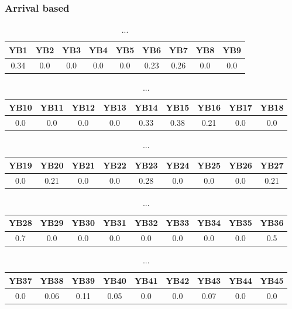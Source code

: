 \documentclass[]{article}
\begin{document}
\subsubsection{Arrival based}
\begin{table}[h]
      \centering
      \begin{tabular}{|c|c|c|c|c|c|c|c|c|}
            \hline
            YB1  & YB2 & YB3 & YB4 & YB5 & YB6  & YB7  & YB8 & YB9 \\
            \hline
            0.34 & 0.0 & 0.0 & 0.0 & 0.0 & 0.23 & 0.26 & 0.0 & 0.0 \\
            \hline
      \end{tabular}
      \caption{...}
\end{table}
\begin{table}[h]
      \centering
      \begin{tabular}{|c|c|c|c|c|c|c|c|c|}
            \hline
            YB10 & YB11 & YB12 & YB13 & YB14 & YB15 & YB16 & YB17 & YB18 \\
            \hline
            0.0  & 0.0  & 0.0  & 0.0  & 0.33 & 0.38 & 0.21 & 0.0  & 0.0  \\
            \hline
      \end{tabular}
      \caption{...}
\end{table}
\begin{table}[h]
      \centering
      \begin{tabular}{|c|c|c|c|c|c|c|c|c|}
            \hline
            YB19 & YB20 & YB21 & YB22 & YB23 & YB24 & YB25 & YB26 & YB27 \\
            \hline
            0.0  & 0.21 & 0.0  & 0.0  & 0.28 & 0.0  & 0.0  & 0.0  & 0.21 \\
            \hline
      \end{tabular}
      \caption{...}
\end{table}
\begin{table}[h]
      \centering
      \begin{tabular}{|c|c|c|c|c|c|c|c|c|}
            \hline
            YB28 & YB29 & YB30 & YB31 & YB32 & YB33 & YB34 & YB35 & YB36 \\
            \hline
            0.7  & 0.0  & 0.0  & 0.0  & 0.0  & 0.0  & 0.0  & 0.0  & 0.5  \\
            \hline
      \end{tabular}
      \caption{...}
\end{table}
\begin{table}[h]
      \centering
      \begin{tabular}{|c|c|c|c|c|c|c|c|c|}
            \hline
            YB37 & YB38 & YB39 & YB40 & YB41 & YB42 & YB43 & YB44 & YB45 \\
            \hline
            0.0  & 0.06 & 0.11 & 0.05 & 0.0  & 0.0  & 0.07 & 0.0  & 0.0  \\
            \hline
      \end{tabular}
      \caption{...}
\end{table}
\end{document}
